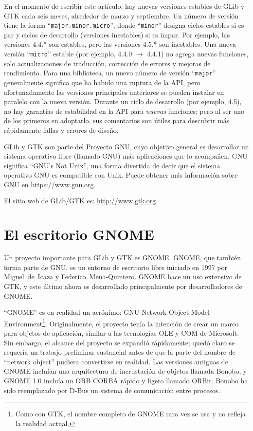 En el momento de escribir este artículo, hay nuevas versiones estables de GLib y GTK cada seis meses, alrededor de marzo y septiembre. Un número de versión tiene la forma ``\texttt{major.minor.micro}'', donde ``\texttt{minor}'' designa ciclos estables si es par y ciclos de desarrollo (versiones inestables) si es impar.  Por ejemplo, las versiones 4.4.* son estables, pero las versiones 4.5.* son inestables. Una nueva versión ``\texttt{micro}'' estable (por ejemplo, 4.4.0 $\rightarrow$ 4.4.1) no agrega nuevas funciones, solo actualizaciones de traducción, corrección de errores y mejoras de rendimiento. Para una biblioteca, un nuevo número de versión ``\texttt{major}'' generalmente significa que ha habido una ruptura de la API, pero afortunadamente las versiones principales anteriores se pueden instalar en paralelo con la nueva versión. Durante un ciclo de desarrollo (por ejemplo, 4.5), no hay garantías de estabilidad en la API para \emph{nuevas} funciones; pero al ser uno de los primeros en adoptarlo, sus comentarios son útiles para descubrir más rápidamente fallas y errores de diseño.

GLib y GTK son parte del Proyecto GNU, cuyo objetivo general es desarrollar un sistema operativo libre (llamado GNU) más aplicaciones que lo acompañen. GNU significa ``GNU's Not Unix'', una forma divertida de decir que el sistema operativo GNU es compatible con Unix. Puede obtener más información sobre GNU en \url{https://www.gnu.org}.

El sitio web de GLib/GTK es: \url{http://www.gtk.org}

\section{El escritorio GNOME}

Un proyecto importante para GLib y GTK es GNOME. GNOME, que también forma parte de GNU, es un entorno de escritorio libre iniciado en 1997 por Miguel~de~Icaza y Federico~Mena-Quintero. GNOME hace un uso extensivo de GTK, y este último ahora es desarrollado principalmente por desarrolladores de GNOME.

``GNOME'' es en realidad un acrónimo: GNU Network Object Model Environment\footnote{Como con GTK, el nombre completo de GNOME rara vez se usa y no refleja la realidad actual.}. Originalmente, el proyecto tenía la intención de crear un marco para objetos de aplicación, similar a las tecnologías OLE y COM de Microsoft. Sin embargo, el alcance del proyecto se expandió rápidamente; quedó claro se requería un trabajo preliminar sustancial antes de que la parte del nombre de ``network object'' pudiera convertirse en realidad. Las versiones antiguas de GNOME incluían una arquitectura de incrustación de objetos llamada Bonobo, y GNOME 1.0 incluía un ORB CORBA rápido y ligero llamado ORBit. Bonobo ha sido reemplazado por D-Bus un sistema de comunicación entre procesos.

